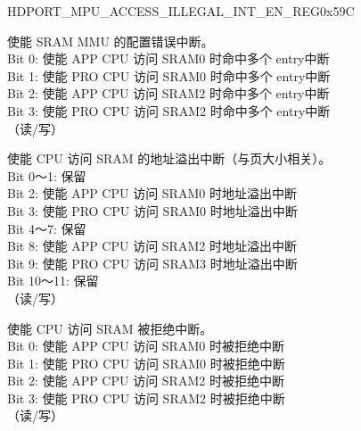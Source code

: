 \begin{register}{H}{DPORT\_MPU\_ACCESS\_ILLEGAL\_INT\_EN\_REG}{0x59C}\label{regdesc:MPUACCESSILLEGALINTENAREG}
%
%
%
%
%
\regnewline%
\begin{regdesc}\begin{reglist}
\item [DPORT\_MEM\_MMU\_MULTI\_HIT\_INT\_EN] 使能 SRAM MMU 的配置错误中断。\\
Bit 0: 使能 APP CPU 访问 SRAM0 时命中多个 entry中断\\
Bit 1: 使能 PRO CPU 访问 SRAM0 时命中多个 entry中断\\
Bit 2: 使能 APP CPU 访问 SRAM2 时命中多个 entry中断\\
Bit 3: 使能 PRO CPU 访问 SRAM2 时命中多个 entry中断\\
（读/写）
\item [DPORT\_MEM\_ACCESS\_ILLEGAL\_INT\_EN] 使能 CPU 访问 SRAM 的地址溢出中断（与页大小相关）。\\
Bit 0～1: 保留\\
Bit 2: 使能 APP CPU 访问 SRAM0 时地址溢出中断\\
Bit 3: 使能 PRO CPU 访问 SRAM0 时地址溢出中断\\
Bit 4～7: 保留\\
Bit 8: 使能 APP CPU 访问 SRAM2 时地址溢出中断\\
Bit 9: 使能 PRO CPU 访问 SRAM3 时地址溢出中断\\
Bit 10～11: 保留\\
（读/写）
\item [DPORT\_MEM\_ACCESS\_DENY\_INT\_EN] 使能 CPU 访问 SRAM 被拒绝中断。\\
Bit 0: 使能 APP CPU 访问 SRAM0 时被拒绝中断\\
Bit 1: 使能 PRO CPU 访问 SRAM0 时被拒绝中断\\
Bit 2: 使能 APP CPU 访问 SRAM2 时被拒绝中断\\
Bit 3: 使能 PRO CPU 访问 SRAM2 时被拒绝中断\\
（读/写）
\end{reglist}\end{regdesc}
\end{register}

